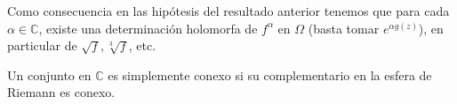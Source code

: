 Como consecuencia en las hipótesis del resultado anterior tenemos que para cada $\alpha \in \mathbb{C}$, existe una determinación holomorfa de $f^{\alpha}$ en $\Omega$ (basta tomar $e^{\alpha g(z)}$), en particular de $\sqrt{f}, \sqrt[3]{f}$, etc.

\begin{observación}
    Un conjunto en $\mathbb{C}$ es simplemente conexo si su complementario en la esfera de Riemann es conexo.
\end{observación}


